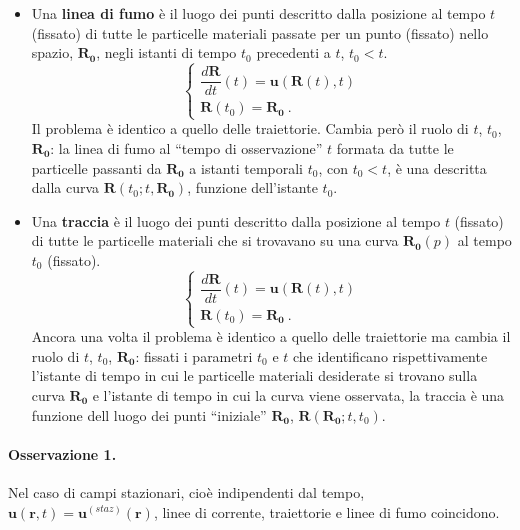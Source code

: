 \begin{itemize}
\item
Una \textbf{linea di fumo} è il luogo dei punti descritto dalla posizione al tempo $t$ (fissato) di tutte le particelle materiali passate per un punto (fissato) nello spazio, $\bm{R_0}$, negli istanti di tempo $t_0$ precedenti a $t$, $t_0 < t$.
\begin{equation}
\begin{cases}
 \dfrac{d\bm{R}}{dt}(t) = \bm{u}(\bm{R}(t),t) \\
 \bm{R}(t_0) = \bm{R_0} \ .
\end{cases}
\end{equation}
Il problema è identico a quello delle traiettorie.
Cambia però il ruolo di $t$, $t_0$, $\bm{R_0}$: la linea di fumo al ``tempo di osservazione'' $t$ formata da tutte le particelle passanti da $\bm{R_0}$ a istanti temporali $t_0$, con $t_0<t$, è una descritta dalla curva $\bm{R}(t_0;t,\bm{R_0})$, funzione dell'istante $t_0$.



\item
 Una \textbf{traccia} è il luogo dei punti descritto dalla posizione al tempo $t$ (fissato) di tutte le particelle materiali che si trovavano su una curva $\bm{R_0}(p)$ al tempo $t_0$ (fissato).  
\begin{equation}
\begin{cases}
 \dfrac{d\bm{R}}{dt}(t) = \bm{u}(\bm{R}(t),t) \\
 \bm{R}(t_0) = \bm{R_0} \ .
\end{cases}
\end{equation}
Ancora una volta il problema è identico a quello delle traiettorie ma cambia il ruolo di $t$, $t_0$, $\bm{R_0}$: fissati i parametri $t_0$ e $t$ che identificano rispettivamente l'istante di tempo in cui le particelle materiali desiderate si trovano sulla curva $\bm{R_0}$ e l'istante di tempo in cui la curva viene osservata, la traccia è una funzione dell luogo dei punti ``iniziale'' $\bm{R_0}$, $\bm{R}(\bm{R_0};t,t_0)$. 

\end{itemize}

\vspace{0.5cm}
\paragraph{Osservazione 1.} Nel caso di campi stazionari, cioè indipendenti dal tempo, $\bm{u}(\bm{r},t) = \bm{u}^{(staz)}(\bm{r})$,  linee di corrente, traiettorie e linee di fumo coincidono.

\vspace{3cm}

